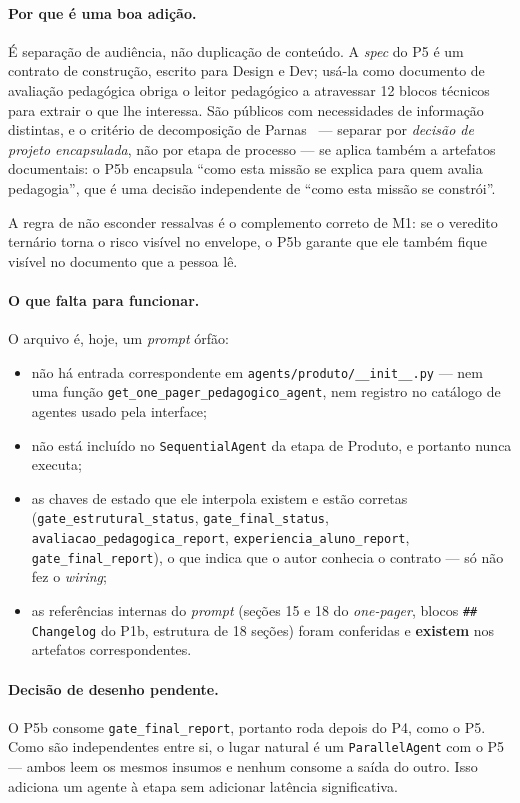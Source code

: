 \documentclass[11pt,a4paper]{article}
\newcommand{\cod}[1]{\texttt{\small #1}}
\begin{document}
\paragraph{Por que é uma boa adição.} É separação de audiência, não duplicação de conteúdo. A \textit{spec}
do P5 é um contrato de construção, escrito para Design e Dev; usá-la como documento de avaliação pedagógica
obriga o leitor pedagógico a atravessar 12 blocos técnicos para extrair o que lhe interessa. São públicos com
necessidades de informação distintas, e o critério de decomposição de Parnas~\cite{parnas1972} --- separar
por \textit{decisão de projeto encapsulada}, não por etapa de processo --- se aplica também a artefatos
documentais: o P5b encapsula ``como esta missão se explica para quem avalia pedagogia'', que é uma decisão
independente de ``como esta missão se constrói''.

A regra de não esconder ressalvas é o complemento correto de M1: se o veredito ternário torna o risco
visível no envelope, o P5b garante que ele também fique visível no documento que a pessoa lê.

\paragraph{O que falta para funcionar.} O arquivo é, hoje, um \textit{prompt} órfão:

\begin{itemize}[leftmargin=*,itemsep=1pt]
  \item não há entrada correspondente em \cod{agents/produto/\_\_init\_\_.py} --- nem uma função
  \cod{get\_one\_pager\_pedagogico\_agent}, nem registro no catálogo de agentes usado pela interface;
  \item não está incluído no \cod{SequentialAgent} da etapa de Produto, e portanto nunca executa;
  \item as chaves de estado que ele interpola existem e estão corretas (\cod{gate\_estrutural\_status},
  \cod{gate\_final\_status}, \cod{avaliacao\_pedagogica\_report}, \cod{experiencia\_aluno\_report},
  \cod{gate\_final\_report}), o que indica que o autor conhecia o contrato --- só não fez o \textit{wiring};
  \item as referências internas do \textit{prompt} (seções 15 e 18 do \textit{one-pager}, blocos
  \cod{\#\# Changelog} do P1b, estrutura de 18 seções) foram conferidas e \textbf{existem} nos artefatos
  correspondentes.
\end{itemize}

\paragraph{Decisão de desenho pendente.} O P5b consome \cod{gate\_final\_report}, portanto roda depois do P4,
como o P5. Como são independentes entre si, o lugar natural é um \cod{ParallelAgent} com o P5 --- ambos leem
os mesmos insumos e nenhum consome a saída do outro. Isso adiciona um agente à etapa sem adicionar latência
significativa.
\end{document}
